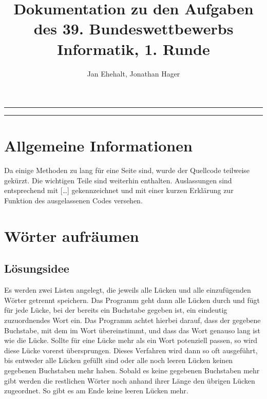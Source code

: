\documentclass[a4paper, 12pt]{scrartcl}
\title{Dokumentation zu den Aufgaben des 39. Bundeswettbewerbs Informatik, 1. Runde}
\author{Jan Ehehalt, Jonathan Hager}
\date{}
\begin{document}
\thispagestyle{empty}
\begin{center}
	\setlength{\parskip}{2ex}
\rule{\textwidth}{.4pt}\par
{\huge\bfseries \thetitle \par}
\rule{\textwidth}{.4pt}\par
\bigbreak
{\Large \theauthor \par}
\end{center}
\newpage

\thispagestyle{empty}
\tableofcontents
\newpage

\section{Allgemeine Informationen}

Da einige Methoden zu lang für eine Seite sind, wurde der Quellcode teilweise gekürzt. Die wichtigen Teile sind weiterhin enthalten. Auslassungen sind entsprechend mit {\glqq}[\dots]{\grqq} gekennzeichnet und mit einer kurzen Erklärung zur Funktion des ausgelassenen Codes versehen.

\section{Wörter aufräumen}
\subsection{Lösungsidee}
Es werden zwei Listen  angelegt,  die  jeweils  alle  Lücken  und  alle  einzufügenden  Wörter  getrennt speichern.  Das  Programm  geht  dann  alle  Lücken  durch  und  fügt  für  jede  Lücke,  bei  der  bereits  ein Buchstabe gegeben ist, ein eindeutig zuzuordnendes Wort ein. Das Programm achtet hierbei darauf, dass der gegebene Buchstabe, mit dem im Wort übereinstimmt, und dass das Wort genauso lang ist wie die Lücke. Sollte für eine Lücke mehr als ein Wort potenziell passen, so wird diese Lücke vorerst übersprungen.  Dieses  Verfahren  wird  dann  so  oft  ausgeführt,  bis  entweder  alle  Lücken  gefüllt  sind oder alle noch leeren Lücken keinen gegebenen Buchstaben mehr haben. Sobald es keine gegebenen Buchstaben  mehr  gibt werden  die  restlichen  Wörter  noch  anhand ihrer  Länge  den  übrigen  Lücken zugeordnet. So gibt es am Ende keine leeren Lücken mehr.
\end{document}
